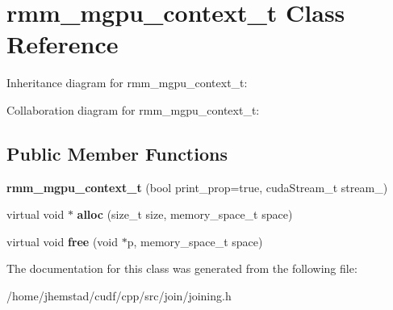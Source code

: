 \hypertarget{classrmm__mgpu__context__t}{}\section{rmm\+\_\+mgpu\+\_\+context\+\_\+t Class Reference}
\label{classrmm__mgpu__context__t}


Inheritance diagram for rmm\+\_\+mgpu\+\_\+context\+\_\+t\+:


Collaboration diagram for rmm\+\_\+mgpu\+\_\+context\+\_\+t\+:
\subsection*{Public Member Functions}
\begin{DoxyCompactItemize}
\item 
{\bfseries rmm\+\_\+mgpu\+\_\+context\+\_\+t} (bool print\+\_\+prop=true, cuda\+Stream\+\_\+t stream\+\_)\hypertarget{classrmm__mgpu__context__t_a5351d5cce036c119cf9a440b54332d16}{}\label{classrmm__mgpu__context__t_a5351d5cce036c119cf9a440b54332d16}

\item 
virtual void $\ast$ {\bfseries alloc} (size\+\_\+t size, memory\+\_\+space\+\_\+t space)\hypertarget{classrmm__mgpu__context__t_a91c429f551aaf2a649fda231d7ccfec6}{}\label{classrmm__mgpu__context__t_a91c429f551aaf2a649fda231d7ccfec6}

\item 
virtual void {\bfseries free} (void $\ast$p, memory\+\_\+space\+\_\+t space)\hypertarget{classrmm__mgpu__context__t_a502fe51a7b2a75c5a01199546379fb29}{}\label{classrmm__mgpu__context__t_a502fe51a7b2a75c5a01199546379fb29}

\end{DoxyCompactItemize}


The documentation for this class was generated from the following file\+:\begin{DoxyCompactItemize}
\item 
/home/jhemstad/cudf/cpp/src/join/joining.\+h\end{DoxyCompactItemize}
